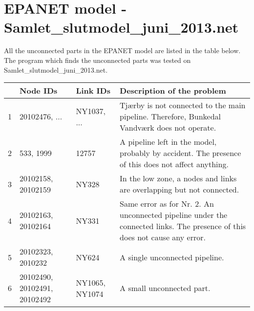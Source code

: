 


\frontmatter
{}

\section{EPANET model - Samlet\_slutmodel\_juni\_2013.net}

All the unconnected parts in the EPANET model are listed in the table below. The program which finds the unconnected parts was tested on Samlet\_slutmodel\_juni\_2013.net.

\begin{center}
\label{mistake_table}
    \begin{tabular}{ | p{3cm} | p{3cm} | p{3cm} | p{3cm} |}
    \hline
    \textbf{} & \textbf{Node IDs} & \textbf{Link IDs}  & \textbf{Description of the problem}  \\ 
    \hline
    1 & 20102476, ...& NY1037, ... & Tjærby is not connected to the main pipeline. Therefore, Bunkedal Vandværk does not operate. \\ 
    \hline
    2 &533, 1999 & 12757 & A pipeline left in the model, probably by accident. The presence of this does not affect anything.  \\ 
    \hline
    3 & 20102158,
    20102159& NY328 & In the low zone, a nodes and links are overlapping but not connected. \\ 
    \hline
    4 & 20102163,
    20102164 & NY331 & Same error as for Nr. 2. An unconnected pipeline under the connected links. The presence of this does not cause any error. \\ 
    \hline
    5 & 20102323, 
    2010232  & NY624 & A single unconnected pipeline. \\ 
    \hline
    6 & 20102490,
    20102491,
    20102492 & NY1065, NY1074 & A small unconnected part.  \\ 
    \hline
    \end{tabular}
\end{center}



























